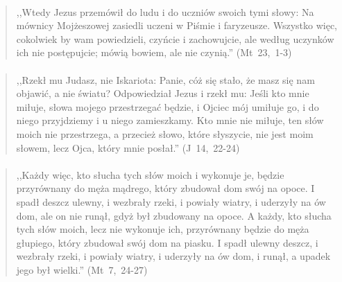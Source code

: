 \documentclass[10pt,a4paper,oneside]{article}
\begin{document}
\paragraph{}
\begin{quote}
,,Wtedy Jezus przemówił do ludu i do uczniów swoich tymi słowy: Na mównicy Mojżeszowej zasiedli uczeni w Piśmie i faryzeusze. Wszystko więc, cokolwiek by wam powiedzieli, czyńcie i zachowujcie, ale według uczynków ich nie postępujcie; mówią bowiem, ale nie czynią.'' \mbox{(Mt 23, 1-3)}
\end{quote}
\paragraph{}
\begin{quote}
,,Rzekł mu Judasz, nie Iskariota: Panie, cóż się stało, że masz się nam objawić, a nie światu? Odpowiedział Jezus i rzekł mu: Jeśli kto mnie miłuje, słowa mojego przestrzegać będzie, i Ojciec mój umiłuje go, i do niego przyjdziemy i u niego zamieszkamy. Kto mnie nie miłuje, ten słów moich nie przestrzega, a przecież słowo, które słyszycie, nie jest moim słowem, lecz Ojca, który mnie posłał.'' \mbox{(J 14, 22-24)}
\end{quote}
\paragraph{}
\begin{quote}
,,Każdy więc, kto słucha tych słów moich i wykonuje je, będzie przyrównany do męża mądrego, który zbudował dom swój na opoce. I spadł deszcz ulewny, i wezbrały rzeki, i powiały wiatry, i uderzyły na ów dom, ale on nie runął, gdyż był zbudowany na opoce. A każdy, kto słucha tych słów moich, lecz nie wykonuje ich, przyrównany będzie do męża głupiego, który zbudował swój dom na piasku. I spadł ulewny deszcz, i wezbrały rzeki, i powiały wiatry, i uderzyły na ów dom, i runął, a upadek jego był wielki.'' \mbox{(Mt 7, 24-27)}
\end{quote}
\end{document}
